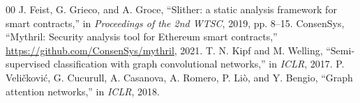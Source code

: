 \documentclass[conference]{IEEEtran}
\begin{document}
\begin{thebibliography}{00}
 J. Feist, G. Grieco, and A. Groce, ``Slither: a static analysis framework for smart contracts,'' in \textit{Proceedings of the 2nd WTSC}, 2019, pp. 8--15.
 ConsenSys, ``Mythril: Security analysis tool for Ethereum smart contracts,'' \url{https://github.com/ConsenSys/mythril}, 2021.
 T. N. Kipf and M. Welling, ``Semi-supervised classification with graph convolutional networks,'' in \textit{ICLR}, 2017.
 P. Veli{\v{c}}kovi{\'{c}}, G. Cucurull, A. Casanova, A. Romero, P. Li{\`{o}}, and Y. Bengio, ``Graph attention networks,'' in \textit{ICLR}, 2018.
\end{thebibliography}
\end{document}
